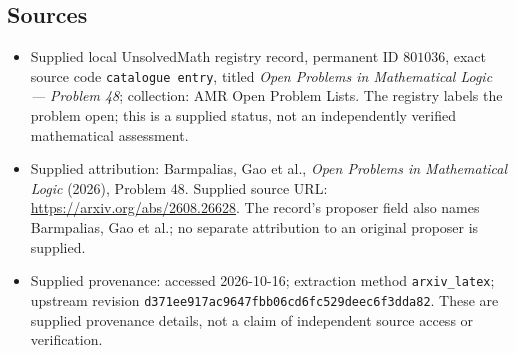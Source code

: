 \documentclass[11pt]{article}
\begin{document}
\subsection{Sources}
\begin{itemize}
\item Supplied local UnsolvedMath registry record, permanent ID \(801036\), exact source code \texttt{catalogue entry}, titled \emph{Open Problems in Mathematical Logic --- Problem 48}; collection: AMR Open Problem Lists. The registry labels the problem open; this is a supplied status, not an independently verified mathematical assessment.
\item Supplied attribution: Barmpalias, Gao et al., \emph{Open Problems in Mathematical Logic} (2026), Problem 48. Supplied source URL: \url{https://arxiv.org/abs/2608.26628}. The record's proposer field also names Barmpalias, Gao et al.; no separate attribution to an original proposer is supplied.
\item Supplied provenance: accessed 2026-10-16; extraction method \texttt{arxiv\_latex}; upstream revision \texttt{d371ee917ac9647fbb06cd6fc529deec6f3dda82}. These are supplied provenance details, not a claim of independent source access or verification.
\end{itemize}
\end{document}
